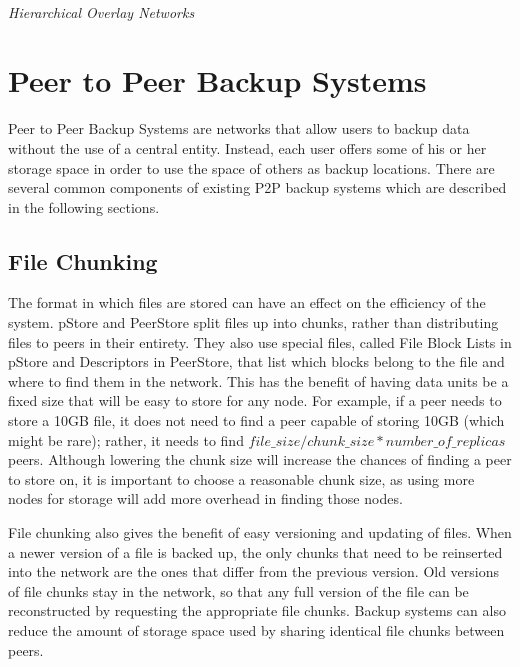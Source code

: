 \documentclass[12pt]{report}
\begin{document}
\hfill \\
\textit{Hierarchical Overlay Networks}
\hfill \\

\section{Peer to Peer Backup Systems}
Peer to Peer Backup Systems are networks that allow users to backup data without the use of a central entity. Instead, each user offers some of his or her storage space in order to use the space of others as backup locations. There are several common components of existing P2P backup systems which are described in the following sections.

\subsection{File Chunking}
The format in which files are stored can have an effect on the efficiency of the system. pStore and PeerStore split files up into chunks, rather than distributing files to peers in their entirety. They also use special files, called File Block Lists in pStore and Descriptors in PeerStore, that list which blocks belong to the file and where to find them in the network. This has the benefit of having data units be a fixed size that will be easy to store for any node. For example, if a peer needs to store a 10GB file, it does not need to find a peer capable of storing 10GB (which might be rare); rather, it needs to find $file\_size/chunk\_size*number\_of\_replicas$ peers. Although lowering the chunk size will increase the chances of finding a peer to store on, it is important to choose a reasonable chunk size, as using more nodes for storage will add more overhead in finding those nodes.

File chunking also gives the benefit of easy versioning and updating of files. When a newer version of a file is backed up, the only chunks that need to be reinserted into the network are the ones that differ from the previous version. Old versions of file chunks stay in the network, so that any full version of the file can be reconstructed by requesting the appropriate file chunks. Backup systems can also reduce the amount of storage space used by sharing identical file chunks between peers.
\end{document}
